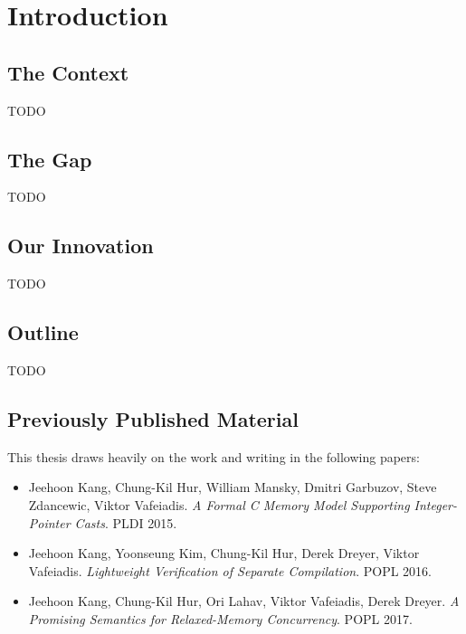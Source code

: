 \section{Introduction}
\label{sec:introduction}

\subsection{The Context}

TODO


\subsection{The Gap}

TODO


\subsection{Our Innovation}

TODO


\subsection{Outline}

TODO


\subsection{Previously Published Material}

This thesis draws heavily on the work and writing in the following papers:

\begin{itemize}
\item[\cite{intptrcast}] Jeehoon Kang, Chung-Kil Hur, William Mansky, Dmitri Garbuzov, Steve
  Zdancewic, Viktor Vafeiadis.  \emph{A Formal C Memory Model Supporting Integer-Pointer Casts}.
  PLDI 2015.
\item[\cite{sepcomp}] Jeehoon Kang, Yoonseung Kim, Chung-Kil Hur, Derek Dreyer, Viktor Vafeiadis.
  \emph{Lightweight Verification of Separate Compilation}.  POPL 2016.
\item[\cite{promising}] Jeehoon Kang, Chung-Kil Hur, Ori Lahav, Viktor Vafeiadis, Derek Dreyer.
  \emph{A Promising Semantics for Relaxed-Memory Concurrency}.  POPL 2017.
\end{itemize}


